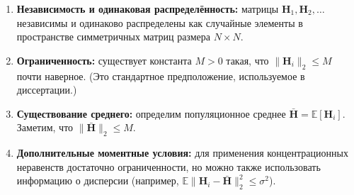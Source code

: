 \documentclass[11pt]{extarticle}
\begin{document}
\begin{enumerate}
    \item \textbf{Независимость и одинаковая распределённость:} матрицы \(\mathbf{H}_1, \mathbf{H}_2, \dots\) независимы и одинаково распределены как случайные элементы в пространстве симметричных матриц размера \(N \times N\).
    \item \textbf{Ограниченность:} существует константа \(M > 0\) такая, что \(\|\mathbf{H}_i\|_2 \le M\) почти наверное. (Это стандартное предположение, используемое в диссертации.)
    \item \textbf{Существование среднего:} определим популяционное среднее \(\bar{\mathbf{H}} = \mathbb{E}[\mathbf{H}_i]\). Заметим, что \(\|\bar{\mathbf{H}}\|_2 \le M\).
    \item \textbf{Дополнительные моментные условия:} для применения концентрационных неравенств достаточно ограниченности, но можно также использовать информацию о дисперсии (например, \(\mathbb{E}\|\mathbf{H}_i - \bar{\mathbf{H}}\|_2^2 \le \sigma^2\)).
\end{enumerate}



\end{document}
